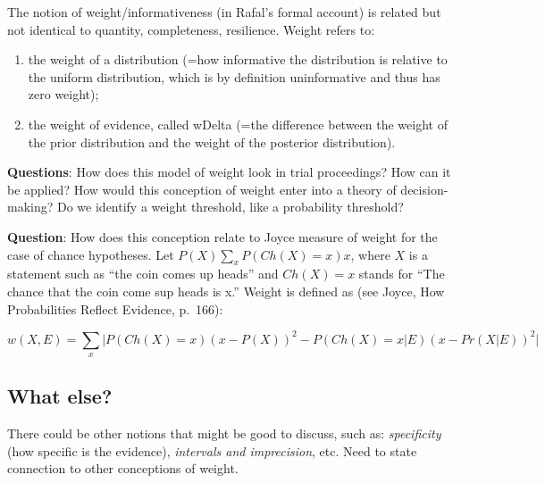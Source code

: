 \documentclass[
  10pt,
  dvipsnames,enabledeprecatedfontcommands]{scrartcl}
\begin{document}
The notion of weight/informativeness (in Rafal's formal account) is
related but not identical to quantity, completeness, resilience. Weight
refers to:

\begin{enumerate}
\def\labelenumi{(\alph{enumi})}
\item
  the weight of a distribution (=how informative the distribution is
  relative to the uniform distribution, which is by definition
  uninformative and thus has zero weight);
\item
  the weight of evidence, called wDelta (=the difference between the
  weight of the prior distribution and the weight of the posterior
  distribution).
\end{enumerate}

\textbf{Questions}: How does this model of weight look in trial
proceedings? How can it be applied? How would this conception of weight
enter into a theory of decision-making? Do we identify a weight
threshold, like a probability threshold?


\textbf{Question}: How does this conception relate to Joyce measure of
weight for the case of chance hypotheses. Let
\(P(X)\sum_x P(Ch(X)=x)x\), where \(X\) is a statement such as ``the
coin comes up heads'' and \(Ch(X)=x\) stands for ``The chance that the
coin come sup heads is x.'' Weight is defined as (see Joyce, How
Probabilities Reflect Evidence, p.~166):

\[w(X, E) = \sum_x \vert P(Ch(X)=x)(x-P(X))^2 - P(Ch(X)=x \vert E)(x-Pr(X \vert E))^2\vert\]


\hypertarget{what-else}{%
\subsection{What else?}\label{what-else}}

There could be other notions that might be good to discuss, such as:
\emph{specificity} (how specific is the evidence), \emph{intervals and
imprecision}, etc. Need to state connection to other conceptions of
weight.

\end{document}
